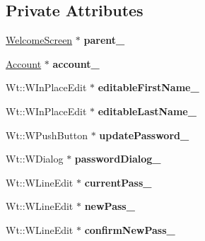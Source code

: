 \subsection*{Private Attributes}
\begin{DoxyCompactItemize}
\item 
\hyperlink{classWelcomeScreen}{Welcome\+Screen} $\ast$ {\bfseries parent\+\_\+}\hypertarget{classProfileWidget_a56c218a697d3523f5a531ad035d927ed}{}\label{classProfileWidget_a56c218a697d3523f5a531ad035d927ed}

\item 
\hyperlink{classAccount}{Account} $\ast$ {\bfseries account\+\_\+}\hypertarget{classProfileWidget_aecefc74b58e1451e684636ba036a6f2f}{}\label{classProfileWidget_aecefc74b58e1451e684636ba036a6f2f}

\item 
Wt\+::\+W\+In\+Place\+Edit $\ast$ {\bfseries editable\+First\+Name\+\_\+}\hypertarget{classProfileWidget_a2b69c8124758bad87a3fbf02eeaa040b}{}\label{classProfileWidget_a2b69c8124758bad87a3fbf02eeaa040b}

\item 
Wt\+::\+W\+In\+Place\+Edit $\ast$ {\bfseries editable\+Last\+Name\+\_\+}\hypertarget{classProfileWidget_a5df00d4c05fd6ed97e633480507c17db}{}\label{classProfileWidget_a5df00d4c05fd6ed97e633480507c17db}

\item 
Wt\+::\+W\+Push\+Button $\ast$ {\bfseries update\+Password\+\_\+}\hypertarget{classProfileWidget_a6bee4c694aa7feae407acaa78288746c}{}\label{classProfileWidget_a6bee4c694aa7feae407acaa78288746c}

\item 
Wt\+::\+W\+Dialog $\ast$ {\bfseries password\+Dialog\+\_\+}\hypertarget{classProfileWidget_aec70048f76904c94c7d20cf9a60f5ad6}{}\label{classProfileWidget_aec70048f76904c94c7d20cf9a60f5ad6}

\item 
Wt\+::\+W\+Line\+Edit $\ast$ {\bfseries current\+Pass\+\_\+}\hypertarget{classProfileWidget_a6c15ca5e77a019a4c9ec63c6065dc669}{}\label{classProfileWidget_a6c15ca5e77a019a4c9ec63c6065dc669}

\item 
Wt\+::\+W\+Line\+Edit $\ast$ {\bfseries new\+Pass\+\_\+}\hypertarget{classProfileWidget_ae672f881b80a6f14f05cff1429faf609}{}\label{classProfileWidget_ae672f881b80a6f14f05cff1429faf609}

\item 
Wt\+::\+W\+Line\+Edit $\ast$ {\bfseries confirm\+New\+Pass\+\_\+}\hypertarget{classProfileWidget_a30033dd6bf1ea9dacb4e51e91f5a6286}{}\label{classProfileWidget_a30033dd6bf1ea9dacb4e51e91f5a6286}


\end{DoxyCompactItemize}
